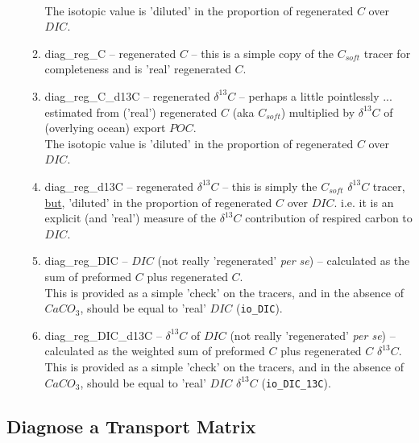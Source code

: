 \begin{itemize}[noitemsep]
\begin{enumerate}[noitemsep]
\\The isotopic value is 'diluted' in the proportion of regenerated \(C\) over \(DIC\).
\vspace{1mm}
\item \textsf{\footnotesize diag\_reg\_C} -- regenerated \(C\) -- this is a simple copy of the \(C_{soft}\) tracer for completeness and is 'real' regenerated \(C\).
\vspace{1mm}
\item \textsf{\footnotesize diag\_reg\_C\_d13C} -- regenerated \(\delta^{13}C\) -- perhaps a little pointlessly ... estimated from ('real') regenerated \(C\) (aka \(C_{soft}\)) multiplied by \(\delta^{13}C\) of (overlying ocean) export \(POC\).
\\The isotopic value is 'diluted' in the proportion of regenerated \(C\) over \(DIC\).
\vspace{1mm}
\item \textsf{\footnotesize diag\_reg\_d13C} -- regenerated \(\delta^{13}C\) -- this is simply the \(C_{soft}\) \(\delta^{13}C\) tracer, \uline{but}, 'diluted' in the proportion of regenerated \(C\) over \(DIC\). i.e. it is an explicit (and 'real') measure of the \(\delta^{13}C\) contribution of respired carbon to \(DIC\).
\vspace{1mm}
\item \textsf{\footnotesize diag\_reg\_DIC} -- \(DIC\) (not really 'regenerated' \textit{per se}) -- calculated as the sum of preformed \(C\) plus regenerated \(C\).
\\This is provided as a simple 'check' on the tracers, and in the absence of \(CaCO_{3}\), should be equal to 'real' \(DIC\) (\texttt{io\_DIC}).
\vspace{1mm}
\item \textsf{\footnotesize diag\_reg\_DIC\_d13C} -- \(\delta^{13}C\) of \(DIC\) (not really 'regenerated' \textit{per se}) -- calculated as the weighted sum of preformed \(C\) plus regenerated \(C\) \(\delta^{13}C\).
\\This is provided as a simple 'check' on the tracers, and in the absence of \(CaCO_{3}\), should be equal to 'real' \(DIC\) \(\delta^{13}C\) (\texttt{io\_DIC\_13C}).
\end{enumerate}

\end{itemize}






%
\newpage
\subsection*{Diagnose a Transport Matrix}
\vspace{1mm}

